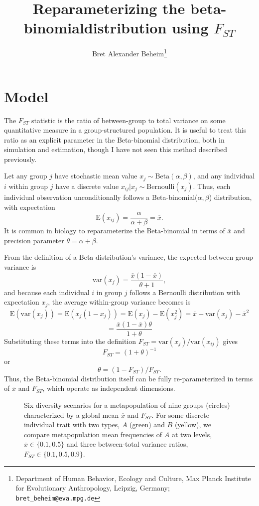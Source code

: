 \documentclass[11pt]{article}
\title{Reparameterizing the beta-binomial\linebreak distribution using $F_{ST}$}
\author[1]{Bret Alexander Beheim\thanks{Department of Human Behavior, Ecology and Culture, Max Planck Institute for Evolutionary Anthropology, Leipzig, Germany; \texttt{bret\_beheim@eva.mpg.de}}}
\date{} %
\begin{document}
\maketitle %

\section{Model}

The $F_{ST}$ statistic is the ratio of between-group to total variance on some quantitative measure in a group-structured population. It is useful to treat this ratio as an explicit parameter in the Beta-binomial distribution, both in simulation and estimation, though I have not seen this method described previously.

Let any group $j$ have stochastic mean value $x_j \sim \mathrm{Beta}(\alpha, \beta)$, and any individual $i$ within group $j$ have a discrete value $x_{ij}|x_j \sim \mathrm{Bernoulli}(x_j)$. Thus, each individual observation unconditionally follows a Beta-binomial($\alpha, \beta$) distribution, with expectation 
\[
  \mathrm{E}(x_{ij}) = \frac{\alpha}{\alpha + \beta} = \overline{x}.
\]
It is common in biology to reparameterize the Beta-binomial in terms of $\overline{x}$ and precision parameter $\theta = \alpha + \beta$.

From the definition of a Beta distribution's variance, the expected between-group variance is
\[
  \mathrm{var}(x_j) = \frac{\overline{x} (1 - \overline{x})}{\theta + 1},
\]
and because each individual $i$ in group $j$ follows a Bernoulli distribution with expectation $x_j$, the average within-group variance becomes is
\[
  \mathrm{E}(\mathrm{var}(x_j)) = \mathrm{E}(x_j(1-x_j)) = \mathrm{E}(x_j) - \mathrm{E}(x_j^2) = \overline{x} - \mathrm{var}(x_j) - \overline{x}^2
\]
\[
  = \frac{\overline{x} (1 - \overline{x}) \theta}{1 + \theta}
\]
Substituting these terms into the definition $F_{ST} = \mathrm{var}(x_j)/\mathrm{var}(x_{ij})$ gives
\[
  F_{ST} = (1 + \theta)^{-1}
\]
or 
\[
  \theta = (1 - F_{ST})/F_{ST}.
\]
Thus, the Beta-binomial distribution itself can be fully re-parameterized in terms of $\overline{x}$ and $F_{ST}$, which operate as independent dimensions.

\begin{figure}[t]
  \centering
  \resizebox{6in}{!}{%
    
  }
  \caption{Six diversity scenarios for a metapopulation of nine groups (circles) characterized by a global mean $\overline{x}$ and $F_{ST}$. For some discrete individual trait with two types, $A$ (green) and $B$ (yellow), we compare metapopulation mean frequencies of $A$ at two levels, $\overline{x} \in \{0.1, 0.5\}$ and three between-total variance ratios, $F_{ST} \in \{0.1, 0.5, 0.9\}$.}
  \label{fig:pieExamples}
\end{figure}
\end{document}
